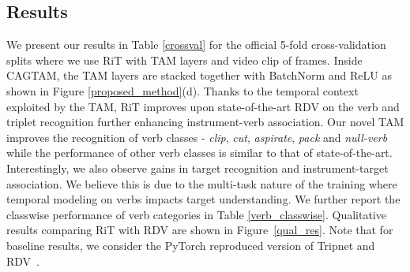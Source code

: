 \documentclass{article}
\begin{document}
\subsection{Results}
We present our results in Table \ref{crossval} for the official 5-fold cross-validation splits where we use RiT with  TAM layers and video clip of  frames. Inside CAGTAM, the  TAM layers are stacked together with BatchNorm and ReLU as shown in Figure \ref{proposed_method}(d). Thanks to the temporal context exploited by the TAM, RiT improves upon state-of-the-art RDV on the verb and triplet recognition further enhancing instrument-verb association. Our novel TAM improves the recognition of  verb classes - \textit{clip}, \textit{cut}, \textit{aspirate}, \textit{pack} and \textit{null-verb} while the performance of other verb classes is similar to that of state-of-the-art. Interestingly, we also observe gains in target recognition and instrument-target association. We believe this is due to the multi-task nature of the training where temporal modeling on verbs impacts target understanding. We further report the classwise performance of verb categories in Table \ref{verb_classwise}. Qualitative results comparing RiT with RDV are shown in Figure~\ref{qual_res}. Note that for baseline results, we consider the PyTorch reproduced version of Tripnet and RDV~\cite{ctsplits}.

\begin{table}[ht]
\centering
    \setlength{\tabcolsep}{45pt}
\caption{Per-class verb recognition AP (\%) on CholecT45 dataset using official cross validation splits.}
    \label{verb_classwise}
\end{table}
\end{document}

